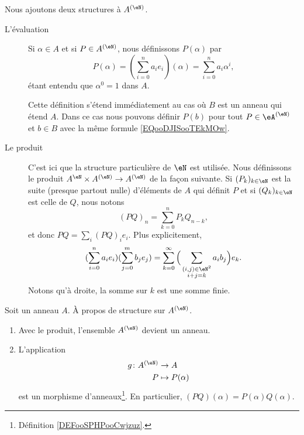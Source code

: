 \begin{definition}      \label{DEFooNXKUooLrGeuh}
    Nous ajoutons deux structures à \( A^{(\eN)}\).
    \begin{description}
        \item[L'évaluation] Si \( \alpha\in A\) et si \( P\in A^{(\eN)}\), nous définissons \( P(\alpha)\) par
            \begin{equation}        \label{EQooDJISooTEkMOw}
                P(\alpha)=(\sum_{i=0}^{n}a_ie_i)(\alpha)=\sum_{i=0}^na_i\alpha^i,
            \end{equation}
            étant entendu que \( \alpha^0=1\) dans \( A\).

            Cette définition s'étend immédiatement au cas où \( B\) est un anneau qui étend \( A\). Dans ce cas nous pouvons définir \( P(b)\) pour tout \( P\in \eA^{(\eN)}\) et \( b\in B\) avec la même formule \eqref{EQooDJISooTEkMOw}.
        \item[Le produit] C'est ici que la structure particulière de \( \eN\) est utilisée. Nous définissons le produit \( A^{\eN}\times A^{(\eN)}\to A^{(\eN)}\) de la façon suivante. Si \( (P_k)_{k\in \eN}\) est la suite (presque partout nulle) d'éléments de \( A\) qui définit \( P\) et si \( (Q_k)_{k\in \eN}\) est celle de \( Q\), nous notons
        \begin{equation}    \label{EQooTNCSooKklisb}
            (PQ)_n=\sum_{k=0}^nP_kQ_{n-k},
        \end{equation}
        et donc \( PQ=\sum_i(PQ)_ie_i\). Plus explicitement,
        \begin{equation}    \label{EQooCIBUooAgpxjL}
            (\sum_{i=0}^na_ie_i)(\sum_{j=0}^mb_je_j)=\sum_{k=0}^{\infty}\Big( \sum_{\substack{  (i,j)\in \eN^2 \\i+j=k}}a_ib_j \Big)e_k.
        \end{equation}
        Notons qu'à droite, la somme sur \( k\) est une somme finie.
    \end{description}
\end{definition}

\begin{proposition}     \label{PROPooGDQCooHziCPH}
    Soit un anneau \( A\). À propos de structure sur \( A^{(\eN)}\).
    \begin{enumerate}
        \item
            Avec le produit, l'ensemble \( A^{(\eN)}\) devient un anneau.
        \item
    L'application
    \begin{equation}
        \begin{aligned}
            g\colon A^{(\eN)}&\to A \\
            P&\mapsto P(\alpha)
        \end{aligned}
    \end{equation}
    est un morphisme d'anneaux\footnote{Définition \ref{DEFooSPHPooCwjzuz}.}. En particulier, \( (PQ)(\alpha)=P(\alpha)Q(\alpha)\).
    \end{enumerate}
\end{proposition}


